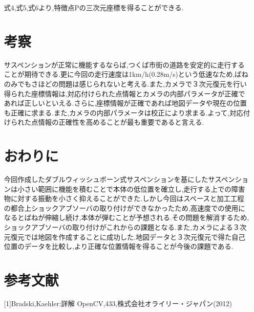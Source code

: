 \documentclass[a4paper]{jarticle}
\begin{document}
式4,式5,式6より,特徴点Pの三次元座標を得ることができる.


\section{考察}
サスペンションが正常に機能するならば,つくば市街の道路を安定的に走行することが期待できる.更に今回の走行速度は1km/h(0.28m/s)という低速なため,ばねのみでもさほどの問題は感じられないと考える.また,カメラで３次元復元を行い得られた座標情報は,対応付けられた点情報とカメラの内部パラメータが正確であれば正しいといえる.さらに,座標情報が正確であれば地図データや現在の位置も正確に求まる.また,カメラの内部パラメータは校正により求まる.よって,対応付けられた点情報の正確性を高めることが最も重要であると言える.


\section{おわりに}
今回作成したダブルウィッシュボーン式サスペンションを基にしたサスペンションは小さい範囲に機能を積むことで本体の低位置を確立し,走行する上での障害物に対する振動を小さく抑えることができた.しかし今回はスペースと加工工程の都合上ショックアブソーバの取り付けができなかったため,高速度での使用になるとばねが伸縮し続け,本体が弾むことが予想される.その問題を解消するため,ショックアブソーバの取り付けがこれからの課題となる.また,カメラによる３次元復元では地図を作成することに成功した.地図データと３次元復元で得た自己位置のデータを比較し,より正確な位置情報を得ることが今後の課題である.

\section{参考文献}
[1]Bradski,Kaehler:詳解 OpenCV,433,株式会社オライリー・ジャパン(2012)
\end{document}
